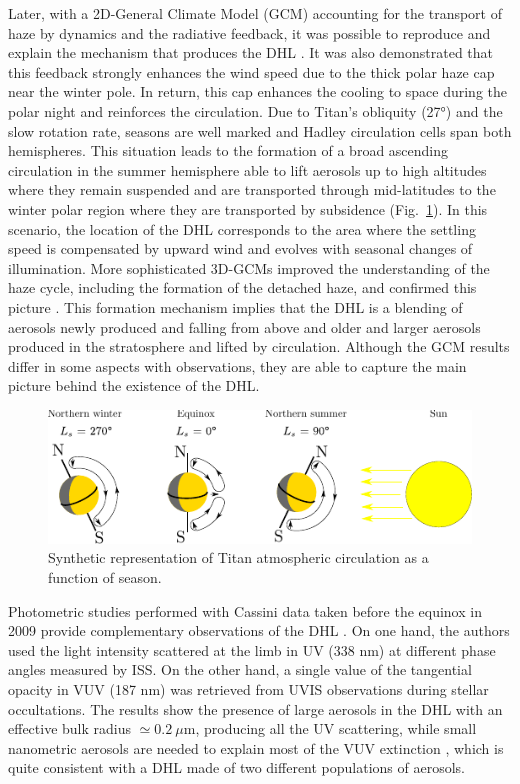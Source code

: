 Later, with a 2D-General Climate Model (GCM) accounting for the transport of haze by dynamics and the radiative
feedback, it was possible to reproduce and explain the mechanism that produces the DHL \citep{Rannou2002}. It was also
demonstrated that this feedback strongly enhances the wind speed due to the thick polar haze cap near the winter pole.
In return, this cap enhances the cooling to space during the polar night \citep{Rannou2004} and
reinforces the circulation. Due to Titan's obliquity (\ang{27}) and the slow rotation rate, seasons are well
marked and Hadley circulation cells span both hemispheres. This situation leads to the formation of a
broad ascending circulation in the summer hemisphere able to lift aerosols up to high altitudes where they remain
suspended and are transported through mid-latitudes to the winter polar region where they are transported by
subsidence (Fig.~\ref{fig:titan_atm_circulation}). In this scenario, the location of the DHL corresponds to the area
where the settling speed is compensated by upward wind and evolves with seasonal changes of illumination.
More sophisticated 3D-GCMs improved the understanding of the haze cycle, including the formation of the detached haze,
and confirmed this picture \citep{Lebonnois2012,Larson2015}. This formation mechanism implies that the DHL
is a blending of aerosols newly produced and falling from above and older and larger aerosols produced in the
stratosphere and lifted by circulation.
Although the GCM results differ in some aspects with observations, they are able to capture the main picture behind
the existence of the DHL.

\begin{figure}[!ht]
    \centering
    \includegraphics[width=.47\textwidth]{Fig/Atmsopheric_circulation}
    \caption{Synthetic representation of Titan atmospheric circulation as a function of season.}
    \label{fig:titan_atm_circulation}
\end{figure}

Photometric studies performed with Cassini data taken before the equinox in 2009 provide complementary observations
of the DHL \citep{Cours2011, Koskinen2011, Seignovert2017}.
On one hand, the authors used the light intensity scattered at the limb in UV (338 nm)
at different phase angles measured by ISS. On the other hand, a single value of the tangential opacity in VUV (187 nm)
was retrieved from UVIS observations during stellar occultations.
The results show the presence of large aerosols in the DHL with an effective bulk radius $\simeq 0.2\ \mu$m,
producing all the UV scattering, while small nanometric aerosols are needed to explain most of the VUV
extinction \citep{Cours2011}, which is quite consistent with a DHL made of two different populations of
aerosols.

